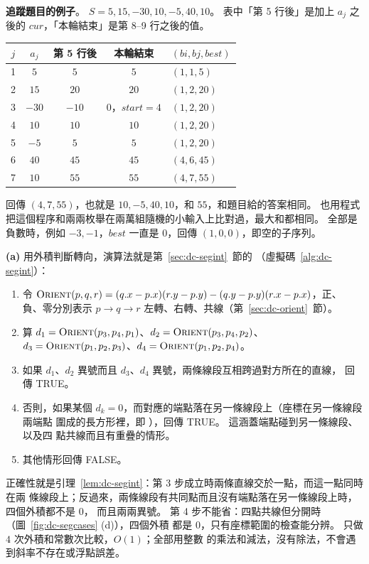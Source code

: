 \textbf{追蹤題目的例子}。 $S = 5, 15, -30, 10, -5, 40, 10$。 表中「第 5 行後」是加上
$a_j$ 之後的 $\mathit{cur}$，「本輪結束」是第 8--9 行之後的值。
\begin{center}
\begin{tabular}{ccccl}
\toprule
$j$ & $a_j$ & 第 5 行後 & 本輪結束 & $(\mathit{bi}, \mathit{bj}, \mathit{best})$ \\
\midrule
1 & $5$ & $5$ & $5$ & $(1, 1, 5)$ \\
2 & $15$ & $20$ & $20$ & $(1, 2, 20)$ \\
3 & $-30$ & $-10$ & $0$，$\mathit{start} = 4$ & $(1, 2, 20)$ \\
4 & $10$ & $10$ & $10$ & $(1, 2, 20)$ \\
5 & $-5$ & $5$ & $5$ & $(1, 2, 20)$ \\
6 & $40$ & $45$ & $45$ & $(4, 6, 45)$ \\
7 & $10$ & $55$ & $55$ & $(4, 7, 55)$ \\
\bottomrule
\end{tabular}
\end{center}
回傳 $(4, 7, 55)$，也就是 $10, -5, 40, 10$，和 $55$，和題目給的答案相同。 也用程式把這個程序和兩兩枚舉在兩萬組隨機的小輸入上比對過，最大和都相同。 全部是負數時，例如
$-3, -1$，$\mathit{best}$ 一直是 $0$，回傳 $(1, 0, 0)$，即空的子序列。

\textbf{(a)} 用外積判斷轉向，演算法就是第~\ref{sec:dc-segint}~節的
（虛擬碼~\ref{alg:dc-segint}）：
\begin{enumerate}[label=\arabic*.]
\item 令 $\proc{Orient}(p, q, r) = (q.x - p.x)(r.y - p.y) - (q.y - p.y)(r.x - p.x)$，正、
負、零分別表示 $p \to q \to r$ 左轉、右轉、共線（第~\ref{sec:dc-orient}~節）。
\item 算 $d_1 = \proc{Orient}(p_3, p_4, p_1)$、$d_2 = \proc{Orient}(p_3, p_4, p_2)$、
$d_3 = \proc{Orient}(p_1, p_2, p_3)$、$d_4 = \proc{Orient}(p_1, p_2, p_4)$。
\item 如果 $d_1$、$d_2$ 異號而且 $d_3$、$d_4$ 異號，兩條線段互相跨過對方所在的直線，
回傳 TRUE。
\item 否則，如果某個 $d_k = 0$，而對應的端點落在另一條線段上（座標在另一條線段兩端點
圍成的長方形裡，即 ），回傳 TRUE。 這涵蓋端點碰到另一條線段、以及四
點共線而且有重疊的情形。
\item 其他情形回傳 FALSE。
\end{enumerate}
正確性就是引理~\ref{lem:dc-segint}：第 3 步成立時兩條直線交於一點，而這一點同時在兩
條線段上；反過來，兩條線段有共同點而且沒有端點落在另一條線段上時，四個外積都不是 $0$，
而且兩兩異號。 第 4 步不能省：四點共線但分開時（圖~\ref{fig:dc-segcases} (d)），四個外積
都是 $0$，只有座標範圍的檢查能分辨。 只做 $4$ 次外積和常數次比較，$O(1)$；全部用整數
的乘法和減法，沒有除法，不會遇到斜率不存在或浮點誤差。

